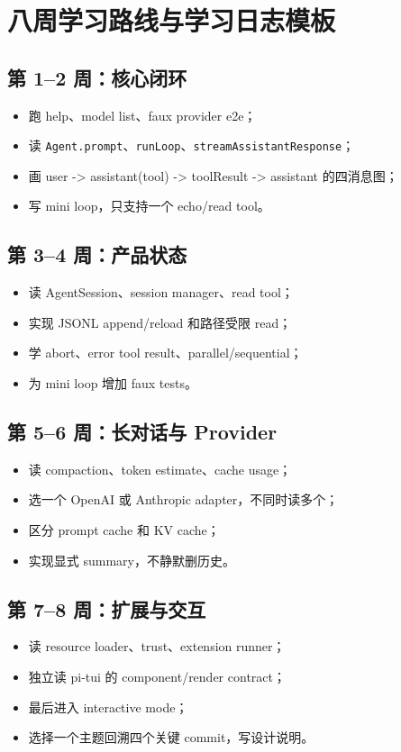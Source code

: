 \documentclass[UTF8,openany,11pt]{ctexbook}
\begin{document}
\chapter{八周学习路线与学习日志模板}

\section{第 1--2 周：核心闭环}
\begin{itemize}
\item 跑 help、model list、faux provider e2e；
\item 读 \texttt{Agent.prompt}、\texttt{runLoop}、\texttt{streamAssistantResponse}；
\item 画 user -> assistant(tool) -> toolResult -> assistant 的四消息图；
\item 写 mini loop，只支持一个 echo/read tool。
\end{itemize}

\section{第 3--4 周：产品状态}
\begin{itemize}
\item 读 AgentSession、session manager、read tool；
\item 实现 JSONL append/reload 和路径受限 read；
\item 学 abort、error tool result、parallel/sequential；
\item 为 mini loop 增加 faux tests。
\end{itemize}

\section{第 5--6 周：长对话与 Provider}
\begin{itemize}
\item 读 compaction、token estimate、cache usage；
\item 选一个 OpenAI 或 Anthropic adapter，不同时读多个；
\item 区分 prompt cache 和 KV cache；
\item 实现显式 summary，不静默删历史。
\end{itemize}

\section{第 7--8 周：扩展与交互}
\begin{itemize}
\item 读 resource loader、trust、extension runner；
\item 独立读 pi-tui 的 component/render contract；
\item 最后进入 interactive mode；
\item 选择一个主题回溯四个关键 commit，写设计说明。
\end{itemize}
\end{document}
